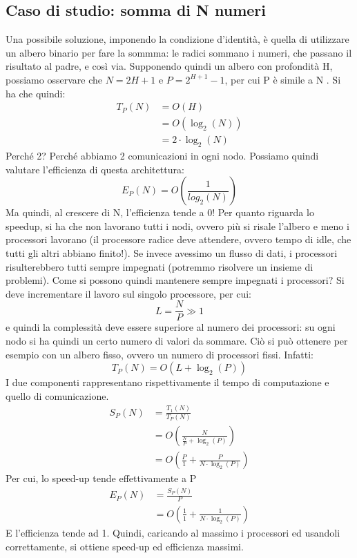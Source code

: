 \subsection{Caso di studio: somma di N numeri}
Una possibile soluzione, imponendo la condizione d'identità, è quella di utilizzare un albero binario per fare la
sommma: le radici sommano i numeri, che passano il risultato al padre, e così via. Supponendo quindi un albero con
profondità H, possiamo osservare che $N = 2{H+1}$ e $P = 2^{H+1} - 1$, per cui P è simile a N . Si ha che quindi:
\begin{align}
T_P(N) &= O \left(H \right)              \nonumber \\
       &= O \left(\log_2(N)\right)      \nonumber \\
       &= 2 \cdot \log_2 \left(N\right)
\end{align}
Perché 2? Perché abbiamo 2 comunicazioni in ogni nodo. Possiamo quindi valutare l'efficienza di questa architettura:
\begin{equation}
 E_P \left( N \right) = O \left( \frac{1}{log_2\left(N\right)} \right)
\end{equation}
Ma quindi, al crescere di N, l'efficienza tende a 0! Per quanto riguarda lo speedup, si ha che non lavorano tutti i
nodi, ovvero più si risale l'albero e meno i processori lavorano (il processore radice deve attendere, ovvero tempo 
di idle, che tutti gli altri abbiano finito!). Se invece avessimo un flusso di dati, i processori risulterebbero 
tutti sempre impegnati (potremmo risolvere un insieme di problemi).
Come si possono quindi mantenere sempre impegnati i processori? Si deve incrementare il lavoro sul singolo processore,
per cui:
\begin{equation}
 L = \frac{N}{P} \gg 1
\end{equation}
e quindi la complessità deve essere superiore al numero dei processori: su ogni nodo si ha quindi un certo numero di
valori da sommare. Ciò si può ottenere per esempio con un albero fisso, ovvero un numero di processori fissi. Infatti:
\begin{equation}
 T_P\left(N\right) = O \left(L + \log_2 \left(P\right)\right)
\end{equation}
I due componenti rappresentano rispettivamente il tempo di computazione e quello di comunicazione.
\begin{align}
 S_P(N) &= \frac{T_1(N)}{T_P(N)} \nonumber \\
        &= O \left( \frac{N}{\frac{N}{P} + \log_2(P)} \right) \nonumber \\
        &= O \left( \frac{P}{1} + \frac{P}{N \cdot \log_2(P)} \right)
\end{align}
Per cui, lo speed-up tende effettivamente a P
\begin{align}
 E_P(N) &= \frac{S_P(N)}{P} \nonumber \\
        &= O \left(\frac{1}{1} + \frac{1}{N \cdot \log_2(P)}\right)
\end{align}
E l'efficienza tende ad 1. Quindi, caricando al massimo i processori ed usandoli correttamente, si ottiene speed-up 
ed efficienza massimi.
